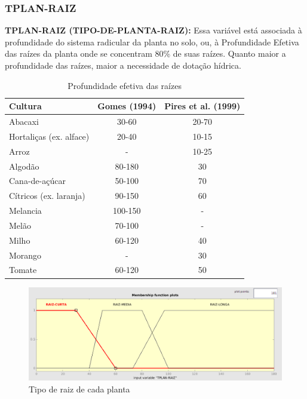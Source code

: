 \subsubsection{TPLAN-RAIZ}

\textbf{TPLAN-RAIZ (TIPO-DE-PLANTA-RAIZ):} Essa variável está associada à profundidade do sistema radicular da planta no solo, ou, à Profundidade Efetiva das raízes da planta onde se concentram 80\% de suas raízes. Quanto maior a profundidade das raízes, maior a
necessidade de dotação hídrica.

\begin{table}[h!]
	\centering
	\caption{Profundidade efetiva das raízes}
	\label{tab:TPLAN-RAIZ}
	\begin{tabular}{lcc}
		\hline \hline
		\textbf{Cultura}                 & \textbf{Gomes (1994)} & \textbf{Pires et al. (1999)} \\
		\hline
		Abacaxi                 & 30-60        & 20-70               \\
		Hortaliças (ex. alface) & 20-40        & 10-15               \\
		Arroz                   & -            & 10-25               \\
		Algodão                 & 80-180       & 30                  \\
		Cana-de-açúcar          & 50-100       & 70                  \\
		Cítricos (ex. laranja)  & 90-150       & 60                  \\
		Melancia                & 100-150      & -                   \\
		Melão                   & 70-100       & -                   \\
		Milho                   & 60-120       & 40                  \\
		Morango                 & -            & 30                  \\
		Tomate                  & 60-120       & 50                  \\
		\hline
	\end{tabular}
\end{table}


\begin{figure}[h!]
\centering
\includegraphics[width=1\linewidth]{Descricao/Imagens/TPLAN-RAIZ}
\caption{Tipo de raiz de cada planta}
\label{fig:TPLAN-RAIZ}
\end{figure}




